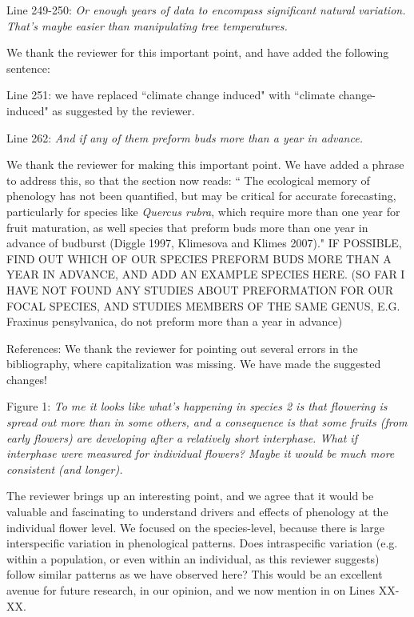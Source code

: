 \documentclass[10.95pt,a4paper]{letter}
\begin{document}
\par Line 249-250: \emph{Or enough years of data to encompass significant natural variation.  That's maybe easier than manipulating tree temperatures.}
\par We thank the reviewer for this important point, and have added the following sentence:
\par Line 251: we have replaced ``climate change induced" with ``climate change-induced" as suggested by the reviewer.
\\
\par Line 262: \emph{And if any of them preform buds more than a year in advance.}
\par We thank the reviewer for making this important point. We have added a phrase to address this, so that the section now reads:
`` The ecological memory of phenology has not been quantified, but may be critical for accurate forecasting, particularly for species like \emph{Quercus rubra}, which require more than one year for fruit maturation, as well species that preform buds more than one year in advance of budburst (Diggle 1997, Klimesova and Klimes 2007)." IF POSSIBLE, FIND OUT WHICH OF OUR SPECIES PREFORM BUDS MORE THAN A YEAR IN ADVANCE, AND ADD AN EXAMPLE SPECIES HERE. (SO FAR I HAVE NOT FOUND ANY STUDIES ABOUT PREFORMATION FOR OUR FOCAL SPECIES, AND STUDIES MEMBERS OF THE SAME GENUS, E.G. Fraxinus pensylvanica, do not preform more than a year in advance)
\\
\par References: We thank the reviewer for pointing out several errors in the bibliography, where capitalization was missing. We have made the suggested changes!
\\
\par Figure 1: \emph{To me it looks like what's happening in species 2 is that flowering is spread out more than in some others, and a consequence is that some fruits (from early flowers) are developing after a relatively short interphase.  What if interphase were measured for individual flowers?  Maybe it would be much more consistent (and longer).}
\par The reviewer brings up an interesting point, and we agree that it would be valuable and fascinating to understand drivers and effects of phenology at the individual flower level. We focused on the species-level, because there is large interspecific variation in phenological patterns. Does intraspecific variation (e.g. within a population, or even within an individual, as this reviewer suggests) follow similar patterns as we have observed here? This would be an excellent avenue for future research, in our opinion, and we now mention in on Lines XX-XX.
\end{document}
